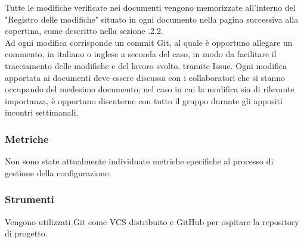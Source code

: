         Tutte le modifiche verificate nei documenti vengono memorizzate all'interno del "Registro delle modifiche" situato in ogni documento nella pagina successiva alla copertina, come descritto nella sezione .2.2.\\
        Ad ogni modifica corrisponde un commit Git, al quale è opportuno allegare un commento, in italiano o inglese a seconda del caso, in modo da facilitare il tracciamento delle modifiche e del lavoro svolto, tramite Issue.
        Ogni modifica apportata ai documenti deve essere discussa con i collaboratori che si stanno occupando del medesimo documento; nel caso in cui la modifica sia di rilevante importanza, è opportuno discuterne con tutto il gruppo durante gli appositi incontri settimanali.
      \subsubsection{Metriche}
      Non sono state attualmente individuate metriche specifiche al processo di gestione della configurazione.
      \subsubsection{Strumenti}
      Vengono utilizzati Git come VCS distribuito e GitHub per ospitare la repository di progetto.
